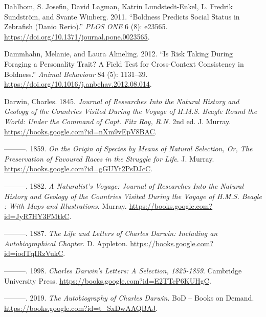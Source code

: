 \documentclass[
]{book}
\newlength{\cslhangindent}
\newlength{\cslentryspacingunit} %
\newenvironment{CSLReferences}[2] %
 {%
  \setlength{\parindent}{0pt}
  \ifodd #1
  \let\oldpar\par
  \def\par{\hangindent=\cslhangindent\oldpar}
  \fi
  \setlength{\parskip}{#2\cslentryspacingunit}
 }%
 {}
\begin{document}
\begin{CSLReferences}{1}{0}
\leavevmode{}%
Dahlbom, S. Josefin, David Lagman, Katrin Lundstedt-Enkel, L. Fredrik Sundström, and Svante Winberg. 2011. {``Boldness {Predicts Social Status} in {Zebrafish} ({Danio} Rerio).''} \emph{PLOS ONE} 6 (8): e23565. \url{https://doi.org/10.1371/journal.pone.0023565}.

\leavevmode{}%
Dammhahn, Melanie, and Laura Almeling. 2012. {``Is Risk Taking During Foraging a Personality Trait? {A} Field Test for Cross-Context Consistency in Boldness.''} \emph{Animal Behaviour} 84 (5): 1131--39. \url{https://doi.org/10.1016/j.anbehav.2012.08.014}.

\leavevmode{}%
Darwin, Charles. 1845. \emph{Journal of {Researches Into} the {Natural History} and {Geology} of the {Countries Visited During} the {Voyage} of {H}.{M}.{S}. {Beagle Round} the {World}: {Under} the {Command} of {Capt}. {Fitz Roy}, {R}.{N}}. 2nd ed. {J. Murray}. \url{https://books.google.com?id=nXm9vEpV8BAC}.

\leavevmode{}%
---------. 1859. \emph{On the {Origin} of {Species} by {Means} of {Natural Selection}, {Or}, {The Preservation} of {Favoured Races} in the {Struggle} for {Life}}. {J. Murray}. \url{https://books.google.com?id=gGUYt2PsDJcC}.

\leavevmode{}%
---------. 1882. \emph{A {Naturalist}'s {Voyage}: {Journal} of {Researches Into} the {Natural History} and {Geology} of the {Countries Visited During} the {Voyage} of {H}.{M}.{S}. {Beagle} : With {Maps} and {Illustrations}}. {Murray}. \url{https://books.google.com?id=JyR7HY3FMtkC}.

\leavevmode{}%
---------. 1887. \emph{The {Life} and {Letters} of {Charles Darwin}: {Including} an {Autobiographical Chapter}}. {D. Appleton}. \url{https://books.google.com?id=iodTqIRzVukC}.

\leavevmode{}%
---------. 1998. \emph{Charles {Darwin}'s {Letters}: {A Selection}, 1825-1859}. {Cambridge University Press}. \url{https://books.google.com?id=E2TTcP6KUHgC}.

\leavevmode{}%
---------. 2019. \emph{The {Autobiography} of {Charles Darwin}}. {BoD -- Books on Demand}. \url{https://books.google.com?id=t_SxDwAAQBAJ}.


\end{CSLReferences}
\end{document}
